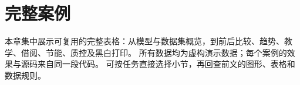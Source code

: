 \section{完整案例}
\label{sec:complete-examples}
本章集中展示可复用的完整表格：从模型与数据集概览，到前后比较、趋势、教学、借阅、节能、质控及黑白打印。
所有数据均为虚构演示数据；每个案例的效果与源码来自同一段代码。
可按任务直接选择小节，再回查前文的图形、表格和数据规则。


\clearpage

\clearpage

\clearpage

\clearpage

\clearpage

\clearpage

\clearpage

